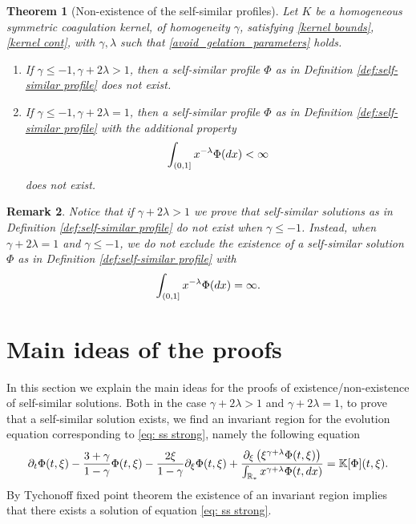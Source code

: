 \documentclass[11pt]{article}
\numberwithin{equation}{section}
\theoremstyle{plain}
\newtheorem{theorem}{Theorem}[section]
\newtheorem{remark}[theorem]{Remark}
\newcommand{\der}{\textup{d}}
\begin{document}
\begin{theorem}[Non-existence of the self-similar profiles] \label{thm:non-existence} 
Let $K$ be a homogeneous symmetric coagulation kernel, of homogeneity $\gamma$, satisfying
\eqref{kernel bounds}, \eqref{kernel cont}, with $\gamma , \lambda $ such that  \eqref{avoid_gelation_parameters} holds.
\begin{enumerate}
    \item If $ \gamma \leq  -1, \gamma + 2\lambda> 1$, then a self-similar profile $\Phi$ as in Definition \ref{def:self-similar profile} does not exist. 
 \item If $ \gamma \leq  -1, \gamma + 2\lambda=1 $, then a self-similar profile $\Phi$ as in Definition \ref{def:self-similar profile} with the additional property
 \begin{align}\label{-lambda moment}
     \int_{(0,1]} x^{-\lambda} \Phi(\der x ) < \infty 
 \end{align}
 does not exist. 
 \end{enumerate}
\end{theorem}

\begin{remark}\label{rem:non existence gamma+2lambda=1}
Notice that if $\gamma + 2 \lambda > 1$ we prove that self-similar solutions as in Definition \ref{def:self-similar profile} do not exist when $\gamma \leq -1 $. Instead, when $\gamma + 2 \lambda =1 $ and $\gamma \leq -1$, we do not exclude the existence of a self-similar solution $\Phi$ as in Definition \ref{def:self-similar profile} with 
\[
  \int_{(0,1]} x^{-\lambda} \Phi(\der x ) = \infty.
\] 
\end{remark}

\section{Main ideas of the proofs}\label{sec:ideas}
In this section we explain the main ideas for the proofs of existence/non-existence of self-similar solutions. 
Both in the case $\gamma + 2 \lambda >1$ and $\gamma + 2 \lambda =1 $, to prove that a self-similar solution exists, we find an invariant region for the evolution equation corresponding to \eqref{eq: ss strong}, namely the following equation
\begin{align} \label{time dependent eq}
\partial_t \Phi(t, \xi) - \frac{3+\gamma}{1-\gamma}\Phi(t, \xi) - \frac{2\xi}{1-\gamma} \partial_\xi \Phi(t, \xi) + \frac{\partial_\xi \left( \xi^{\gamma+\lambda} \Phi(t, \xi)\right)  }{\int_{\mathbb R_*} x^{\gamma+\lambda} \Phi(t, \der x ) } =\mathbb K [\Phi](t, \xi) .
\end{align} 
By Tychonoff fixed point theorem the existence of an invariant region implies that there exists a solution of equation \eqref{eq: ss strong}.
\end{document}
